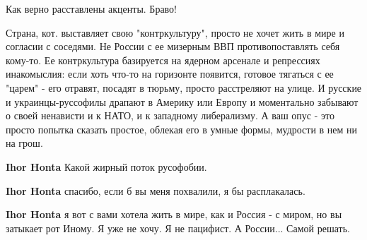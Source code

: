 \begin{itemize}
Как верно расставлены акценты. Браво!

 

Страна, кот. выставляет свою "контркультуру", просто не хочет жить в мире и
согласии с соседями. Не России с ее мизерным ВВП противопоставлять себя
кому-то. Ее контркультура базируется на ядерном арсенале и репрессиях
инакомыслия: если хоть что-то на горизонте появится, готовое тягаться с ее
"царем" - его отравят, посадят в тюрьму, просто расстреляют на улице. И русские
и украинцы-руссофилы драпают в Америку или Европу и моментально забывают о
своей ненависти и к НАТО, и к западному либерализму. А ваш опус - это просто
попытка сказать простое, облекая его в умные формы, мудрости в нем ни на грош.

\begin{itemize}
 
\textbf{Ihor Honta} Какой жирный поток русофобии.

 
\textbf{Ihor Honta} спасибо, если б вы меня похвалили, я бы расплакалась.

 
\textbf{Ihor Honta} я вот с вами хотела жить в мире, как и Россия - с миром, но вы затыкает рот Иному. Я уже не хочу. Я не пацифист. А России... Самой решать.

 

\end{itemize}
\end{itemize}
